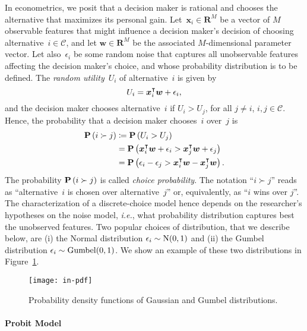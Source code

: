 In econometrics, we posit that a decision maker is rational and chooses the alternative that maximizes its personal gain.
Let~$\bm{x}_i \in \mathbf{R}^M$ be a vector of $M$ observable features that might influence a decision maker's decision of choosing alternative~$i \in \mathcal{C}$, and let $\bm{w}\in \mathbf{R}^M$ be the associated $M$-dimensional parameter vector.
Let also~$\epsilon_i$ be some random noise that captures all unobservable features affecting the decision maker's choice, and whose probability distribution is to be defined.
The \emph{random utility}~$U_i$ of alternative~$i$ is given by
\begin{equation*}
	U_i = \bm{x}_i^\intercal \bm{w} + \epsilon_i,
\end{equation*}
and the decision maker chooses alternative~$i$ if $U_i > U_j$, for all $j \neq i$, $i,j \in \mathcal{C}$.
Hence, the probability that a decision maker chooses~$i$ over~$j$ is
\begin{align*}
	\mathbf{P}\left( i \succ j \right) & \coloneqq \mathbf{P}\left( U_i > U_j \right)                                                  \\
	                 & = \mathbf{P}\left(  \bm{x}_i^\intercal \bm{w} + \epsilon_i > \bm{x}_j^\intercal \bm{w} + \epsilon_j \right) \\
	                 & = \mathbf{P}\left( \epsilon_i - \epsilon_j > \bm{x}_i^\intercal \bm{w} - \bm{x}_j^\intercal \bm{w} \right).
\end{align*}
The probability $\mathbf{P}\left( i \succ j \right)$ is called \emph{choice probability}.
The notation ``$i \succ j$'' reads as ``alternative~$i$ is chosen over alternative~$j$'' or, equivalently, as ``$i$ wins over $j$''.
The characterization of a discrete-choice model hence depends on the researcher's hypotheses on the noise model, \textit{i.e.}, what probability distribution captures best the unobserved features.
Two popular choices of distribution, that we describe below, are (i) the Normal distribution $\epsilon_i \sim \mathrm{N}( 0, 1 )$ and (ii) the Gumbel distribution $\epsilon_i \sim \mathrm{Gumbel}( 0, 1 )$.
We show an example of these two distributions in Figure~\ref{in:fig:pdf}.

\begin{figure}
	\centering
	\texttt{[image: in-pdf]}
	\caption{Probability density functions of Gaussian and Gumbel distributions.}
	\label{in:fig:pdf}
\end{figure}

\paragraph{Probit Model}

